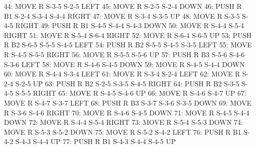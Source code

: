 \documentclass[12pt]{article}
\begin{document}
\begin{appendix}
\begin{itemize}
       44: MOVE R S-3-5 S-2-5 LEFT
       45: MOVE R S-2-5 S-2-4 DOWN
       46: PUSH R B1 S-2-4 S-3-4 S-4-4 RIGHT
       47: MOVE R S-3-4 S-3-5 UP
       48: MOVE R S-3-5 S-4-5 RIGHT
       49: PUSH R B1 S-4-5 S-4-4 S-4-3 DOWN
       50: MOVE R S-4-4 S-5-4 RIGHT
       51: MOVE R S-5-4 S-6-4 RIGHT
       52: MOVE R S-6-4 S-6-5 UP
       53: PUSH R B2 S-6-5 S-5-5 S-4-5 LEFT
       54: PUSH R B2 S-5-5 S-4-5 S-3-5 LEFT
       55: MOVE R S-4-5 S-5-5 RIGHT
       56: MOVE R S-5-5 S-5-6 UP
       57: PUSH R B3 S-5-6 S-4-6 S-3-6 LEFT
       58: MOVE R S-4-6 S-4-5 DOWN
       59: MOVE R S-4-5 S-4-4 DOWN
       60: MOVE R S-4-4 S-3-4 LEFT
       61: MOVE R S-3-4 S-2-4 LEFT
       62: MOVE R S-2-4 S-2-5 UP
       63: PUSH R B2 S-2-5 S-3-5 S-4-5 RIGHT
       64: PUSH R B2 S-3-5 S-4-5 S-5-5 RIGHT
       65: MOVE R S-4-5 S-4-6 UP
       66: MOVE R S-4-6 S-4-7 UP
       67: MOVE R S-4-7 S-3-7 LEFT
       68: PUSH R B3 S-3-7 S-3-6 S-3-5 DOWN
       69: MOVE R S-3-6 S-4-6 RIGHT
       70: MOVE R S-4-6 S-4-5 DOWN
       71: MOVE R S-4-5 S-4-4 DOWN
       72: MOVE R S-4-4 S-5-4 RIGHT
       73: MOVE R S-5-4 S-5-3 DOWN
       74: MOVE R S-5-3 S-5-2 DOWN
       75: MOVE R S-5-2 S-4-2 LEFT
       76: PUSH R B1 S-4-2 S-4-3 S-4-4 UP
       77: PUSH R B1 S-4-3 S-4-4 S-4-5 UP
  \end{itemize}

\end{appendix}

\newpage
\end{document}

